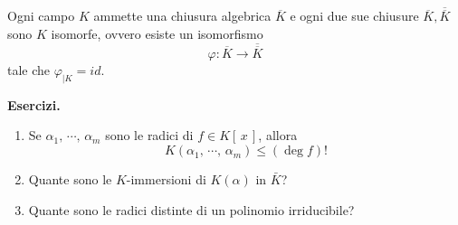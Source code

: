\begin{multicols}{2}
\begin{theorem}
	Ogni campo $ K $ ammette una chiusura algebrica $ \overline{K} $ e ogni due sue chiusure $ \overline{K}, \overline{\overline{K}} $ sono $ K $ isomorfe, ovvero esiste un isomorfismo
	\[ \varphi : \overline{K} \to \overline{\overline{K}} \]
	tale che $ \varphi_{|K} = id $.
\end{theorem}

\textbf{Esercizi.}
\begin{enumerate}
	\item Se $ \alpha_1,\, \cdots,\, \alpha_m $ sono le radici di $ f \in K[\,x\,] $, allora
	 \[ K(\alpha_1,\, \cdots,\, \alpha_m) \leq (\deg f)! \]
	 
	 \item Quante sono le $ K $-immersioni di $ K(\alpha) $ in $ \bar{K} $?
	 
	 \item Quante sono le radici distinte di un polinomio irriducibile?
\end{enumerate}


\end{multicols}



